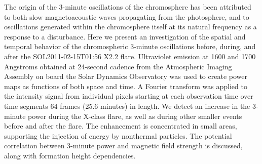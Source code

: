 The origin of the 3-minute oscillations of the chromosphere
has been attributed to both
slow magnetoacoustic waves
propagating from the photosphere,
and to
oscillations generated
within the chromosphere itself
at its natural frequency
as a response to a disturbance.
Here we present an investigation of the
spatial and temporal
behavior of the chromospheric 3-minute oscillations
before, during, and after the
SOL2011-02-15T01:56 X2.2 flare.
Ultraviolet emission at 1600 and 1700 Angstroms
obtained at 24-second cadence
from the Atmospheric Imaging Assembly
on board the Solar Dynamics Observatory
was used to create power maps as functions of both space and time.
A Fourier transform was applied to
the intensity signal from individual pixels
starting at each observation time
over time segments 64 frames (25.6 minutes) in length.
We detect an increase in the 3-minute power
during the X-class flare, as well as during other smaller events before and
after the flare.
The enhancement is
concentrated in small areas,
supporting the injection of energy by nonthermal particles.
The potential correlation between 3-minute power and magnetic field strength
is discussed, along with formation height dependencies.
